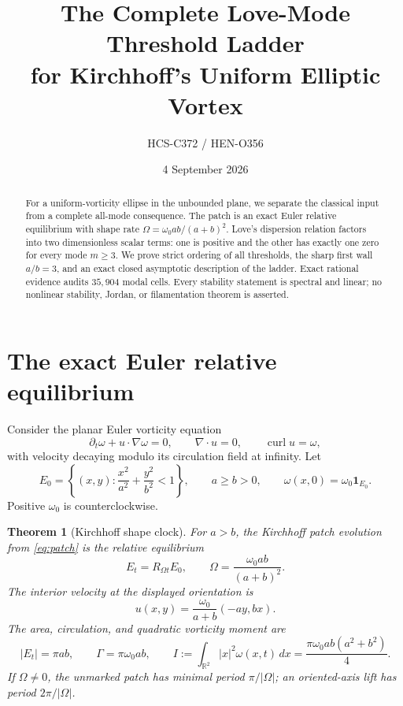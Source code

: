 \documentclass[10pt]{article}
\title{The Complete Love-Mode Threshold Ladder\\
for Kirchhoff's Uniform Elliptic Vortex}
\author{HCS-C372 / HEN-O356}
\date{4 September 2026}
\newtheorem{theorem}{Theorem}
\newcommand{\Real}{\mathbb R}
\begin{document}
\maketitle

\begin{abstract}
For a uniform-vorticity ellipse in the unbounded plane, we separate the
classical input from a complete all-mode consequence.  The patch is an exact
Euler relative equilibrium with shape rate
$\Omega=\omega_0ab/(a+b)^2$.  Love's dispersion relation factors into two
dimensionless scalar terms: one is positive and the other has exactly one
zero for every mode $m\ge3$.  We prove strict ordering of all thresholds,
the sharp first wall $a/b=3$, and an exact closed asymptotic description of the
ladder.  Exact rational evidence audits $35{,}904$ modal cells.  Every
stability statement is spectral and linear; no nonlinear stability,
Jordan, or filamentation theorem is asserted.
\end{abstract}

\section{The exact Euler relative equilibrium}
Consider the planar Euler vorticity equation
\begin{equation}\label{eq:euler}
 \partial_t\omega+u\mathbin{\cdot}\nabla\omega=0,
 \qquad \nabla\mathbin{\cdot}u=0,
 \qquad \operatorname{curl}u=\omega,
\end{equation}
with velocity decaying modulo its circulation field at infinity.  Let
\begin{equation}\label{eq:patch}
 E_0=\left\{(x,y):\frac{x^2}{a^2}+\frac{y^2}{b^2}<1\right\},
 \qquad a\ge b>0,
 \qquad \omega(x,0)=\omega_0\mathbf1_{E_0}.
\end{equation}
Positive $\omega_0$ is counterclockwise.

\begin{theorem}[Kirchhoff shape clock]\label{thm:kirchhoff}
For $a>b$, the Kirchhoff patch evolution from \eqref{eq:patch} is the relative
equilibrium
\begin{equation}\label{eq:omega}
 E_t=R_{\Omega t}E_0,
 \qquad \Omega=\frac{\omega_0ab}{(a+b)^2}.
\end{equation}
The interior velocity at the displayed orientation is
\begin{equation}\label{eq:inside}
 u(x,y)=\frac{\omega_0}{a+b}(-ay,bx).
\end{equation}
The area, circulation, and quadratic vorticity moment are
\begin{equation}\label{eq:invariants}
 |E_t|=\pi ab,\qquad
 \Gamma=\pi\omega_0ab,\qquad
 I:=\int_{\Real^2}|x|^2\omega(x,t)\,dx
 =\frac{\pi\omega_0ab(a^2+b^2)}4.
\end{equation}
If $\Omega\ne0$, the unmarked patch has minimal period
$\pi/|\Omega|$; an oriented-axis lift has period $2\pi/|\Omega|$.
\end{theorem}
\end{document}
